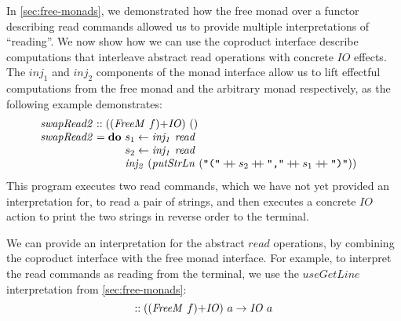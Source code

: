 \documentclass{jfp1}
\newcommand{\fmext}[1]{\langle\langle #1 \rangle\rangle}
\newcommand{\kw}[1]{\textbf{#1}}
\begin{document}
In \autoref{sec:free-monads}, we demonstrated how the free monad over
a functor describing read commands allowed us to provide multiple
interpretations of ``reading''. We now show how we can use the
coproduct interface describe computations that interleave abstract
read operations with concrete $\mathit{IO}$ effects. The
$\mathit{inj_1}$ and $\mathit{inj_2}$ components of the monad
interface allow us to lift effectful computations from the free monad
and the arbitrary monad respectively, as the following example
demonstrates:
\begin{displaymath}
  \begin{array}{@{}l}
    \mathit{swapRead2} :: (\cprd{(\mathit{FreeM}~f)}{\mathit{IO}})~() \\
    \mathit{swapRead2} = \kw{do}~
    \begin{array}[t]{@{}l}
      s_1 \leftarrow \mathit{inj_1}~\mathit{read} \\
      s_2 \leftarrow \mathit{inj_1}~\mathit{read} \\
      \mathit{inj_2}~(\mathit{putStrLn}~(\texttt{"("} \dplus s_2 \dplus \texttt{","} \dplus s_1 \dplus \texttt{")"}))
    \end{array}
  \end{array}
\end{displaymath}
This program executes two read commands, which we have not yet
provided an interpretation for, to read a pair of strings, and then
executes a concrete $\mathit{IO}$ action to print the two strings in
reverse order to the terminal.

We can provide an interpretation for the abstract $\mathit{read}$
operations, by combining the coproduct interface with the free monad
interface. For example, to interpret the read commands as reading from
the terminal, we use the $\mathit{useGetLine}$ interpretation from
\autoref{sec:free-monads}:
\begin{displaymath}
  [\fmext{\mathit{useGetLine}}, \mathit{id}] :: (\cprd{(\mathit{FreeM}~f)}{\mathit{IO}})~a \to \mathit{IO}~a
\end{displaymath}
\end{document}
